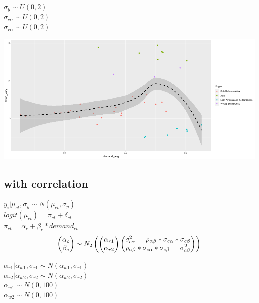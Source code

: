 \documentclass[12pt]{article}
\begin{document}
\noindent
 $ \sigma_y \sim U(0,2) $ \\
 $ \sigma_{c\alpha} \sim U(0,2) $ \\
 $ \sigma_{r\alpha}\sim U(0,2) $ \\
\begin{center}
\includegraphics[scale=0.4]{2.png}
\end{center}
\newpage
 
\subsection{with correlation}
 $ y_i|\mu_{ct},\sigma_y \sim N(\mu_{ct}, \sigma_y) $ \\
 $ logit(\mu_{ct})=  \pi_{ct} + \delta_{ct} $\\
 $ \pi_{ct} = \alpha_c + \beta_c*demand_{ct} $ \\
\begin{equation*}
  \begin{pmatrix}
  	\alpha_c \\
  	\beta_c 
  \end{pmatrix}
  \sim N_2
  \begin{pmatrix}
  	\begin{pmatrix}
    	\alpha_{r1} \\
    	\alpha_{r2}
  	\end{pmatrix}
  	\begin{pmatrix}
    	\sigma^2_{c\alpha}  $\indent$  \rho_{\alpha\beta}*\sigma_{c\alpha}*\sigma_{c\beta} \\
    	\rho_{\alpha\beta}*\sigma_{c\alpha}*\sigma_{c\beta} $\indent$ \sigma^2_{c\beta}
  	\end{pmatrix} 
  \end{pmatrix} \\
\end{equation*}

\noindent
 $ \alpha_{r1}|\alpha_{w1},\sigma_{r1} \sim N(\alpha_{w1},\sigma_{r1}) $ \\
 $ \alpha_{r2}|\alpha_{w2},\sigma_{r2} \sim N(\alpha_{w2},\sigma_{r2}) $ \\
 $ \alpha_{w1} \sim N(0,100) $ \\
 $ \alpha_{w2} \sim N(0,100) $ \\
\end{document}
